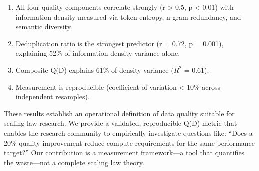 \begin{enumerate}
\item All four quality components correlate strongly (r > 0.5, p < 0.01) with information density measured via token entropy, n-gram redundancy, and semantic diversity.
\item Deduplication ratio is the strongest predictor (r = 0.72, p = 0.001), explaining 52\% of information density variance alone.
\item Composite Q(D) explains 61\% of density variance (\(R^2\) = 0.61).
\item Measurement is reproducible (coefficient of variation < 10\% across independent resamples).
\end{enumerate}

These results establish an operational definition of data quality suitable for scaling law research. We provide a validated, reproducible Q(D) metric that enables the research community to empirically investigate questions like: ``Does a 20\% quality improvement reduce compute requirements for the same performance target?'' Our contribution is a measurement framework---a tool that quantifies the waste---not a complete scaling law theory.
